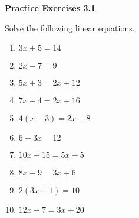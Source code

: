  \vspace{1ex}
\noindent\textbf{Practice Exercises 3.1}

\vspace{0.75ex}

Solve the following linear equations.
\begin{multicols}{2}
\begin{enumerate}[noitemsep, label = \color{blue}\arabic*. ]
    \item $3x + 5 = 14$
    \item $2x - 7 = 9$
    \item $5x + 3 = 2x + 12$
    \item $7x - 4 = 2x + 16$
    \item $4(x - 3) = 2x + 8$
    \item $6 - 3x = 12$
    \item $10x + 15 = 5x - 5$
    \item $8x - 9 = 3x + 6$
    \item $2(3x + 1) = 10$
    \item $12x - 7 = 3x + 20$
\end{enumerate}
\end{multicols}
